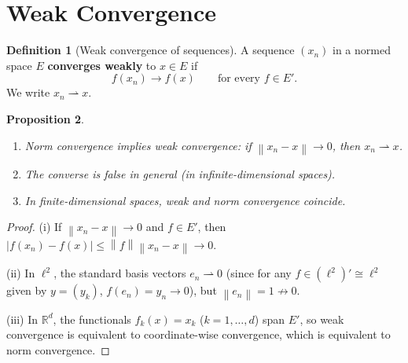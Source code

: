 \documentclass[a4paper,12pt]{book}
\newcommand{\R}{\mathbb{R}}
\newcommand{\norm}[1]{\left\| #1 \right\|}
\newcommand{\weakto}{\rightharpoonup}
\theoremstyle{definition}
\newtheorem{definition}{Definition}[chapter]
\theoremstyle{plain}
\newtheorem{proposition}[definition]{Proposition}
\theoremstyle{remark}
\begin{document}
\section{Weak Convergence}\label{sec:weak-convergence}

\begin{definition}[Weak convergence of sequences]\label{def:weak-convergence}
\index{$\weakto$}
A sequence $(x_n)$ in a normed space $E$ \textbf{converges weakly}
to $x\in E$ if
\[
  f(x_n) \to f(x) \qquad \text{for every } f\in E'.
\]
We write $x_n\weakto x$.
\end{definition}

\begin{proposition}\label{prop:weak-vs-norm}
\leavevmode
\begin{enumerate}[label=(\roman*)]
  \item Norm convergence implies weak convergence: if $\norm{x_n-x}\to 0$,
        then $x_n\weakto x$.
  \item The converse is false in general (in infinite-dimensional spaces).
  \item In finite-dimensional spaces, weak and norm convergence coincide.
\end{enumerate}
\end{proposition}

\begin{proof}
(i) If $\norm{x_n-x}\to 0$ and $f\in E'$, then
$|f(x_n)-f(x)|\le\norm{f}\norm{x_n-x}\to 0$.

(ii) In $\ell^2$, the standard basis vectors $e_n\weakto 0$ (since for any
$f\in(\ell^2)'\cong\ell^2$ given by $y=(y_k)$, $f(e_n)=y_n\to 0$), but
$\norm{e_n}=1\not\to 0$.

(iii) In $\R^d$, the functionals $f_k(x)=x_k$ ($k=1,\ldots,d$) span $E'$,
so weak convergence is equivalent to coordinate-wise convergence, which is
equivalent to norm convergence.
\end{proof}
\end{document}
